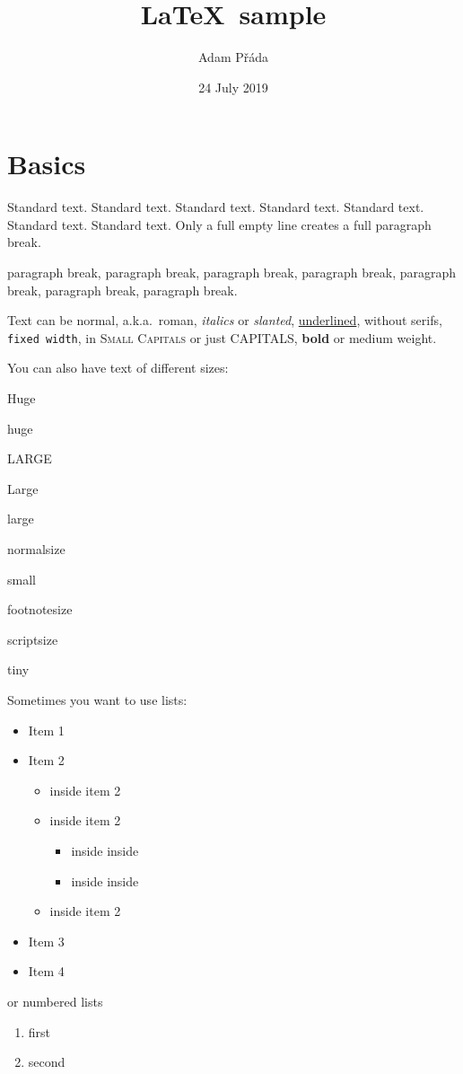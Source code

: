 \documentclass[11pt]{article}
\title{\LaTeX\ sample}
\author{Adam Přáda}
\date{24 July 2019}
\begin{document}
\maketitle
\section{Basics}
Standard text. Standard text. Standard text. Standard text. Standard text. Standard text. Standard text.
Only a full empty line creates a full paragraph break.

paragraph break, paragraph break, paragraph break, paragraph break, paragraph break, paragraph break, paragraph break.

Text can be \textnormal{normal}, a.k.a.~\textrm{roman}, \emph{italics} or \textsl{slanted}, \underline{underlined}, \textsf{without serifs}, \texttt{fixed width}, in \textsc{Small Capitals} or just \uppercase{capitals}, \textbf{bold} or \textmd{medium weight}.

You can also have text of different sizes:

{\Huge Huge}

{\huge huge}

{\LARGE LARGE}

{\Large Large}

{\large large}

{\normalsize normalsize}

{\small small}

{\footnotesize footnotesize}

{\scriptsize scriptsize}

{\tiny tiny}

\pagebreak
Sometimes you want to use lists:
\begin{itemize}
	\item Item 1
	\item Item 2
	\begin{itemize}
		\item inside item 2
		\item inside item 2
		\begin{itemize}
			\item inside inside
			\item inside inside
		\end{itemize}
		\item inside item 2
	\end{itemize}
	\item Item 3
	\item Item 4
\end{itemize}
or numbered lists
\begin{enumerate}
	\item first
	\item second
\end{enumerate}
\end{document}
